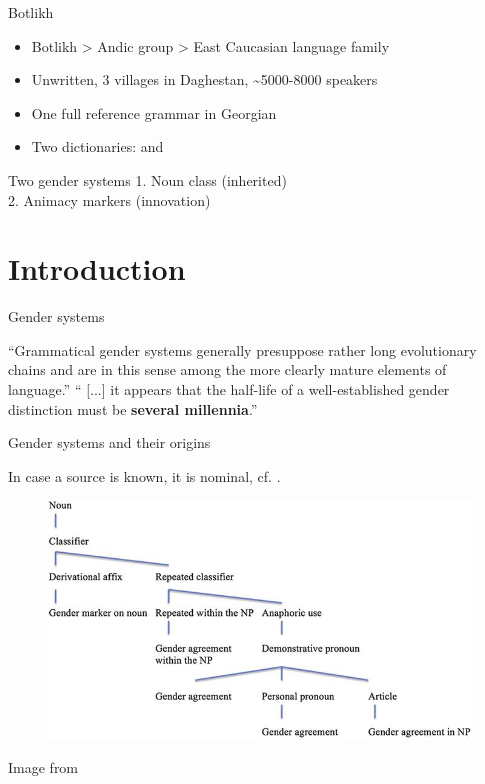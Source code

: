 
 


\begin{frame}
\titlepage
\end{frame}

\begin{frame}{Botlikh}
\begin{itemize}
    \item Botlikh > Andic group > East Caucasian language family
    \item Unwritten, 3 villages in Daghestan, \textasciitilde{}5000-8000 speakers
    \item One full reference grammar in Georgian 
    \citep{gudava1962}
    \item Two dictionaries:
    \citep{saidovaabusov2012} and \citep{alekseev2019}
\end{itemize} 
\pause
\vfill
\begin{block}{Two gender systems}
1. Noun class (inherited)\\
2. Animacy markers (innovation)
\end{block}
\end{frame}

\section{Introduction}
\begin{frame}{Gender systems}
\begin{center}
``Grammatical gender systems generally
presuppose rather long evolutionary chains and are in this sense among the more
clearly mature elements of language.'' \citep[112]{dahl2004}
\pause
\vfill
`` [...] it appears that the half-life of a well-established gender distinction must be \textbf{several millennia}.'' \citep[200]{dahl2004}
\end{center}
\end{frame}

\begin{frame}{Gender systems and their origins}

In case a source is known, it is nominal, cf. \citep{corbett1991, audring2016}.

\vfill

\begin{figure}[h]
\centering
\includegraphics[scale=0.35]{images/gender.jpg}
\end{figure}

\tiny{Image from \citep{audring2016}}

\end{frame}

